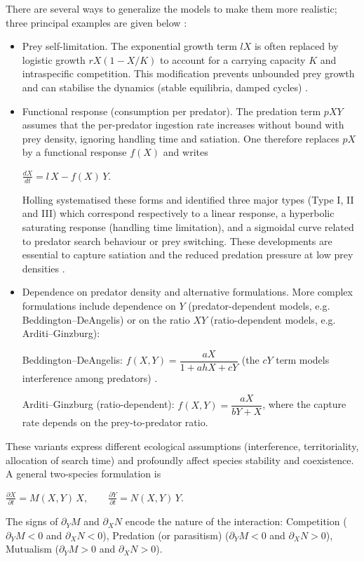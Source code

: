 \documentclass[10pt, a4paper]{amsart}
\newcounter{assu}
\theoremstyle{plain}
\theoremstyle{definition}
\theoremstyle{remark}
\numberwithin{equation}{section}
\begin{document}
There are several ways to generalize the models to make them more realistic; three principal examples are given below :
\begin{itemize}
\item  Prey self-limitation. The exponential growth term $lX$ is often replaced by logistic growth $rX(1-X/K)$ to account for a carrying capacity $K$ and intraspecific competition. This modification prevents unbounded prey growth and can stabilise the dynamics (stable equilibria, damped cycles) \cite{ref3}.

\item  Functional response (consumption per predator). The predation term $pXY$ assumes that the per-predator ingestion rate increases without bound with prey density, ignoring handling time and satiation. One therefore replaces $pX$ by a functional response $f(X)$ and writes

$\frac{dX}{dt}=l\,X - f(X)\,Y.$

Holling systematised these forms and identified three major types (Type I, II and III) which correspond respectively to a linear response, a hyperbolic saturating response (handling time limitation), and a sigmoidal curve related to predator search behaviour or prey switching. These developments are essential to capture satiation and the reduced predation pressure at low prey densities \cite{ref29,ref8,ref35}.

\item  Dependence on predator density and alternative formulations. More complex formulations include dependence on $Y$ (predator-dependent models, e.g. Beddington–DeAngelis) or on the ratio $XY$ (ratio-dependent models, e.g. Arditi–Ginzburg):

Beddington–DeAngelis: $f(X,Y)=\dfrac{aX}{1+ahX+cY}$ (the $cY$ term models interference among predators) \cite{ref39}.

Arditi–Ginzburg (ratio-dependent): $f(X,Y)=\dfrac{aX}{bY+X}$, where the capture rate depends on the prey-to-predator ratio.
\end{itemize}
These variants express different ecological assumptions (interference, territoriality, allocation of search time) and profoundly affect species stability and coexistence.
A general two-species formulation is

$\frac{\partial X}{\partial t}=M(X,Y)\,X,\qquad \frac{\partial Y}{\partial t}=N(X,Y)\,Y.$

The signs of $\partial_Y M$ and $\partial_X N$ encode the nature of the interaction: Competition ($\partial_Y M<0$ and $\partial_X N<0$), Predation (or parasitism) ($\partial_Y M<0$ and $\partial_X N>0$), Mutualism ($\partial_Y M>0$ and $\partial_X N>0$).
\end{document}

